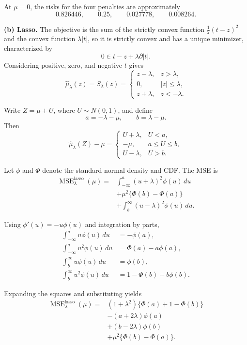 \documentclass[answers,12pt,addpoints]{exam}
\providecommand{\MSE}{\operatorname{MSE}}
\begin{document}
\begin{questions}
\begin{solution}
At $\mu=0$, the risks for the four penalties are approximately
\[
0.826446,\qquad
0.25,\qquad
0.027778,\qquad
0.008264.
\]

\textbf{(b) Lasso.}
The objective is the sum of the strictly convex function
$\frac12(t-z)^2$ and the convex function $\lambda|t|$, so it is
strictly convex and has a unique minimizer, characterized by
\[
0\in t-z+\lambda\partial|t|.
\]
Considering positive, zero, and negative $t$ gives
\[
\boxed{
\widehat\mu_\lambda(z)
=
S_\lambda(z)
=
\begin{cases}
z-\lambda, & z>\lambda,\\
0, & |z|\leq\lambda,\\
z+\lambda, & z<-\lambda.
\end{cases}
}
\]

Write $Z=\mu+U$, where $U\sim N(0,1)$, and define
\[
a=-\lambda-\mu,
\qquad
b=\lambda-\mu.
\]
Then
\[
\widehat\mu_\lambda(Z)-\mu
=
\begin{cases}
U+\lambda, & U<a,\\
-\mu, & a\leq U\leq b,\\
U-\lambda, & U>b.
\end{cases}
\]

Let $\phi$ and $\Phi$ denote the standard normal density and CDF.
The MSE is
\begin{align*}
\MSE_\lambda^{\mathrm{lasso}}(\mu)
={}&
\int_{-\infty}^{a}(u+\lambda)^2\phi(u)\,du\\
&+\mu^2\{\Phi(b)-\Phi(a)\}\\
&+\int_b^\infty(u-\lambda)^2\phi(u)\,du.
\end{align*}

Using $\phi'(u)=-u\phi(u)$ and integration by parts,
\begin{align*}
\int_{-\infty}^{a}u\phi(u)\,du
&=-\phi(a),\\
\int_{-\infty}^{a}u^2\phi(u)\,du
&=\Phi(a)-a\phi(a),\\
\int_b^\infty u\phi(u)\,du
&=\phi(b),\\
\int_b^\infty u^2\phi(u)\,du
&=1-\Phi(b)+b\phi(b).
\end{align*}

Expanding the squares and substituting yields
\[
\boxed{
\begin{aligned}
\MSE_\lambda^{\mathrm{lasso}}(\mu)
={}&
(1+\lambda^2)\{\Phi(a)+1-\Phi(b)\}\\
&-(a+2\lambda)\phi(a)\\
&+(b-2\lambda)\phi(b)\\
&+\mu^2\{\Phi(b)-\Phi(a)\}.
\end{aligned}
}
\]


\end{solution}
\end{questions}
\end{document}
